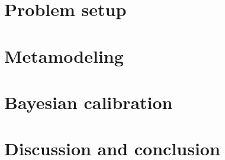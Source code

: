 \begin{refsection}


\section{Problem setup} \label{sec:Hydrology:ProblemSetup}


\section{Metamodeling} \label{sec:Hydrology:Metamodeling}


\section{Bayesian calibration} \label{sec:Hydrology:BayesianCalibration}


\section{Discussion and conclusion} \label{sec:Hydrology:DiscussionConclusion}


\printbibliography[heading=subbibliography]
\end{refsection}